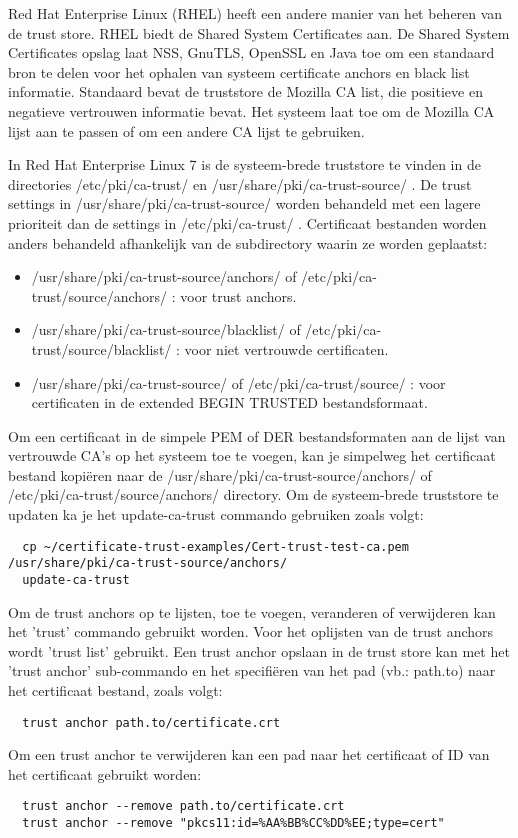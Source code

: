 Red Hat Enterprise Linux (RHEL) heeft een andere manier van het beheren van de trust store. RHEL biedt de Shared System Certificates aan.
De Shared System Certificates opslag laat NSS, GnuTLS, OpenSSL en Java toe om een standaard bron te delen voor het ophalen van systeem certificate anchors en black list informatie.
Standaard bevat de truststore de Mozilla CA list, die positieve en negatieve vertrouwen informatie bevat. Het systeem laat toe om de Mozilla CA lijst aan te passen of om een andere CA lijst te gebruiken. \autocite{RHELtruststore} \break

In Red Hat Enterprise Linux 7 is de systeem-brede truststore te vinden in de directories /etc/pki/ca-trust/ en /usr/share/pki/ca-trust-source/ . De trust settings in /usr/share/pki/ca-trust-source/ worden behandeld met een lagere prioriteit dan de settings in /etc/pki/ca-trust/ .
Certificaat bestanden worden anders behandeld afhankelijk van de subdirectory waarin ze worden geplaatst:
\begin{itemize}
  \item /usr/share/pki/ca-trust-source/anchors/ of /etc/pki/ca-trust/source/anchors/ : voor trust anchors.
  \item /usr/share/pki/ca-trust-source/blacklist/ of /etc/pki/ca-trust/source/blacklist/ : voor niet vertrouwde certificaten.
  \item /usr/share/pki/ca-trust-source/ of /etc/pki/ca-trust/source/ : voor certificaten in de extended BEGIN TRUSTED bestandsformaat.
\end{itemize} \autocite{RHELtruststore}

Om een certificaat in de simpele PEM of DER bestandsformaten aan de lijst van vertrouwde CA's op het systeem toe te voegen, kan je simpelweg het certificaat bestand kopiëren naar de /usr/share/pki/ca-trust-source/anchors/ of /etc/pki/ca-trust/source/anchors/ directory. Om de systeem-brede truststore te updaten ka je het update-ca-trust commando gebruiken zoals volgt:
\begin{verbatim}
  cp ~/certificate-trust-examples/Cert-trust-test-ca.pem /usr/share/pki/ca-trust-source/anchors/
  update-ca-trust
\end{verbatim} 

Om de trust anchors op te lijsten, toe te voegen, veranderen of verwijderen kan het 'trust' commando gebruikt worden.
Voor het oplijsten van de trust anchors wordt 'trust list' gebruikt.
Een trust anchor opslaan in de trust store kan met het 'trust anchor' sub-commando en het specifiëren van het pad (vb.: path.to) naar het certificaat bestand, zoals volgt:
\begin{verbatim}
  trust anchor path.to/certificate.crt
\end{verbatim} 
Om een trust anchor te verwijderen kan een pad naar het certificaat of ID van het certificaat gebruikt worden:
\begin{verbatim}
  trust anchor --remove path.to/certificate.crt
  trust anchor --remove "pkcs11:id=%AA%BB%CC%DD%EE;type=cert"
\end{verbatim} 
\autocite{RHELtruststore} \break

